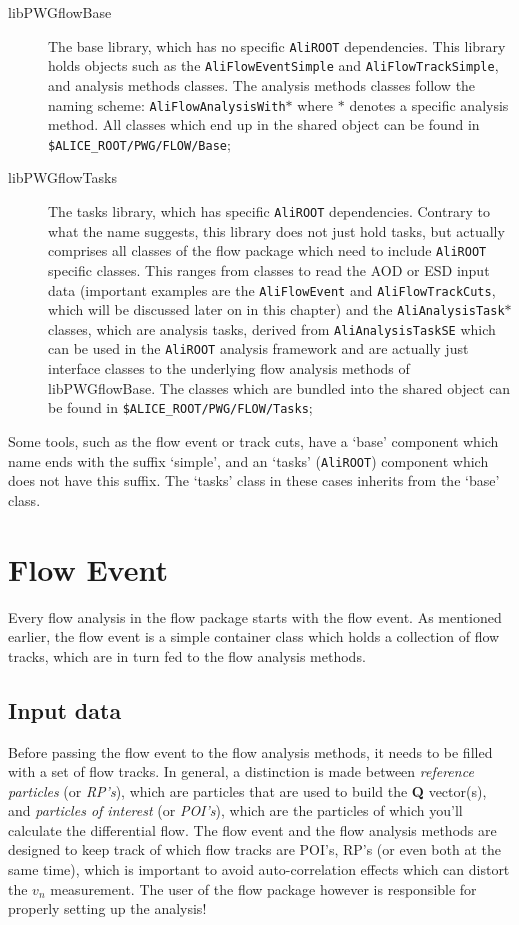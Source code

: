 \documentclass[a4paper]{book}
\numberwithin{equation}{subsection}
\begin{document}
\begin{description}
    \item [libPWGflowBase] The base library, which has no specific \texttt{AliROOT} dependencies. This library holds objects such as the \texttt{AliFlowEventSimple} and \texttt{AliFlowTrackSimple}, and analysis methods classes. The analysis methods classes follow the naming scheme: \texttt{AliFlowAnalysisWith$\ast$} where $\ast$ denotes a specific analysis method. All classes which end up in the  shared object can be found in \texttt{\$ALICE\_ROOT/PWG/FLOW/Base};
    \item [libPWGflowTasks]  The tasks library, which has specific \texttt{AliROOT} dependencies. Contrary to what the name suggests, this library does not just hold tasks, but actually comprises all classes of the flow package which need to include \texttt{AliROOT} specific classes. This ranges from classes to read the AOD or ESD input data (important examples are the \texttt{AliFlowEvent} and \texttt{AliFlowTrackCuts}, which will be discussed later on in this chapter) and the \texttt{AliAnalysisTask$\ast$} classes, which are analysis tasks, derived from \texttt{AliAnalysisTaskSE} which can be used in the \texttt{AliROOT} analysis framework and are actually just interface classes to the underlying flow analysis methods of libPWGflowBase. The classes which are bundled into the  shared object can be found in \texttt{\$ALICE\_ROOT/PWG/FLOW/Tasks};
\end{description}
Some tools, such as the flow event or track cuts, have a `base' component which name ends with the suffix `simple', and an `tasks' (\texttt{AliROOT}) component which does not have this suffix. The `tasks' class in these cases inherits from the `base' class. 

\section{Flow Event}
Every flow analysis in the flow package starts with the flow event. As mentioned earlier, the flow event is a simple container class which holds a collection of flow tracks, which are in turn fed to the flow analysis methods. 
\subsection{Input data}
Before passing the flow event to the flow analysis methods, it needs to be filled with a set of flow tracks. In general, a distinction is made between \emph{reference particles} (or \emph{RP's}), which are particles that are used to build the \textbf{Q} vector(s), and \emph{particles of interest} (or \emph{POI's}), which are the particles of which you'll calculate the differential flow. The flow event and the flow analysis methods are designed to keep track of which flow tracks are POI's, RP's (or even both at the same time), which is important to avoid auto-correlation effects which can distort the $v_n$ measurement. The user of the flow package however is responsible for properly setting up the analysis! 
\end{document}
